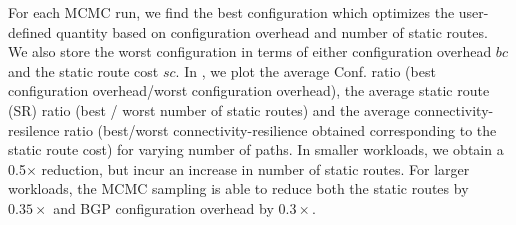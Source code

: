 %
For each MCMC run, we find the best configuration
which optimizes the user-defined quantity based on 
configuration overhead and number of static routes. 
We also store the worst configuration in terms of either
configuration overhead $bc$ and the static route cost 
$sc$. In , we plot the average Conf. ratio 
(best configuration overhead/worst configuration overhead), 
the average static route (SR) ratio 
(best / worst number of static routes) and the average 
connectivity-resilence ratio (best/worst connectivity-resilience obtained corresponding to the 
static route cost)
for varying number of paths. 
In smaller workloads, we obtain a 0.5$\times$ reduction, 
but incur an increase in number of static routes. For 
larger workloads, the MCMC sampling is able to
reduce both the static routes by $0.35\times$ and 
BGP configuration overhead by $0.3\times$. 



